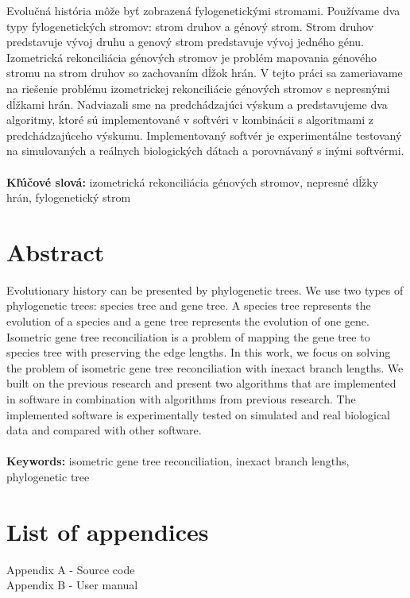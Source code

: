 \documentclass[12pt,a4paper,oneside]{book}
\begin{document}
Evolučná história môže byť zobrazená fylogenetickými stromami. Používame dva typy fylogenetických stromov: strom druhov a génový strom. Strom druhov predstavuje vývoj druhu a genový strom predstavuje vývoj jedného génu. Izometrická rekonciliácia génových stromov je problém mapovania génového stromu na strom druhov so zachovaním dĺžok hrán. V tejto práci sa zameriavame na riešenie problému izometrickej rekonciliácie génových stromov s nepresnými dĺžkami hrán. Nadviazali sme na predchádzajúci výskum a predstavujeme dva algoritmy, ktoré sú implementované v softvéri v kombinácii s algoritmami z predchádzajúceho výskumu. Implementovaný softvér je experimentálne testovaný na simulovaných a reálnych biologických dátach a porovnávaný s inými softvérmi.
\\\\
\textbf{Kľúčové slová:} izometrická rekonciliácia génových stromov, nepresné dĺžky hrán, fylogenetický strom
\vfill\eject 

\chapter*{Abstract}

Evolutionary history can be presented by phylogenetic trees. We use two types of phylogenetic trees: species tree and gene tree. A species tree represents the evolution of a species and a gene tree represents the evolution of one gene. Isometric gene tree reconciliation is a problem of mapping the gene tree to species tree with preserving the edge lengths. In this work, we focus on solving the problem of isometric gene tree reconciliation with inexact branch lengths. We built on the previous research and present two algorithms that are implemented in software in combination with algorithms from previous research. The implemented software is experimentally tested on simulated and real biological data and compared with other software.
\\\\
\textbf{Keywords:} isometric gene tree reconciliation, inexact branch lengths, phylogenetic tree
\vfill\eject  

\listoffigures
\newpage

\tableofcontents
\newpage

\mainmatter


\vfill\eject







\backmatter


\vfill\eject 

\nocite{*}



\chapter*{List of appendices}

Appendix A - Source code \\
Appendix B - User manual

\end{document}
